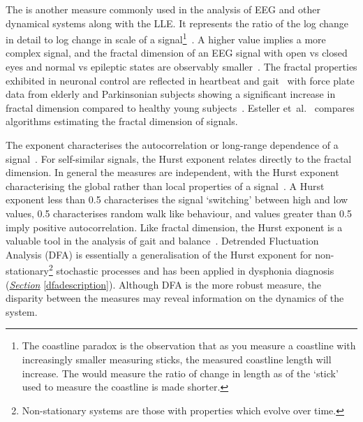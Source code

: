 \documentclass[12pt, twoside]{book}
\renewcommand\emph[1]{\textit{\color{USred}{#1}}}
\begin{document}

The \emph{fractal dimension} is another measure commonly used in the analysis of EEG and other dynamical systems along with the LLE. It represents the ratio of the log change in detail to log change in scale of a signal\footnote{The coastline paradox is the observation that as you measure a coastline with increasingly smaller measuring sticks, the measured coastline length will increase. The \emph{fractal dimension} would measure the ratio of change in length as of the `stick' used to measure the coastline is made shorter.}~\cite{mandelbrot1967long}. A higher value implies a more complex signal, and the fractal dimension of an EEG signal with open vs closed eyes and normal vs epileptic states are observably smaller~\cite{eegfractal, seizuredimensions}. The fractal properties exhibited in neuronal control are reflected in heartbeat and gait~\cite{fractalgait} with force plate data from elderly and Parkinsonian subjects showing a significant increase in fractal dimension compared to healthy young subjects~\cite{hfdcop, fractalpd, fractalbalance}. Esteller et~al.~\cite{fractaldimensions} compares algorithms estimating the fractal dimension of signals.

The \emph{Hurst} exponent characterises the autocorrelation or long-range dependence of a signal~\cite{hurst1965long}. For self-similar signals, the Hurst exponent relates directly to the fractal dimension. In general the measures are independent, with the Hurst exponent characterising the global rather than local properties of a signal~\cite{hurstfractal}. A Hurst exponent less than 0.5 characterises the signal `switching' between high and low values, 0.5 characterises random walk like behaviour, and values greater than 0.5 imply positive autocorrelation. Like fractal dimension, the Hurst exponent is a valuable tool in the analysis of gait and balance~\cite{duarte2000fractal}. Detrended Fluctuation Analysis (DFA) is essentially a generalisation of the Hurst exponent for non-stationary\footnote{Non-stationary systems are those with properties which evolve over time.} stochastic processes and has been applied in dysphonia diagnosis (\textit{\hyperref[dfadescription]{Section}} \ref{dfadescription}). Although DFA is the more robust measure, the disparity between the measures may reveal information on the dynamics of the system.
\end{document}
